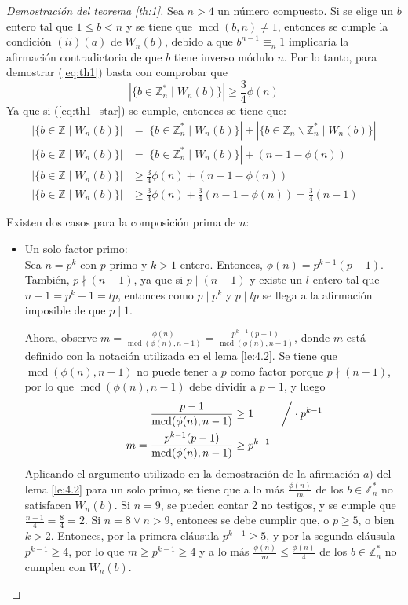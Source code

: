 \documentclass[hidelinks, 12pt]{article}
\newcommand{\Z}{\mathbb{Z}}
\newcommand{\Zs}{\mathbb{Z}^*}
\DeclareMathOperator{\mcd}{mcd}
\begin{document}
\begin{proof}[Demostración del teorema \ref{th:1}]
    Sea $n>4$ un número compuesto. Si se elige un $b$ entero tal que $1\leq b<n$ y se tiene que $\mcd(b,n)\neq 1$, entonces se cumple la condición $(ii)(a)$ de $W_n(b)$, debido a que $b^{n-1}\equiv_n 1$ implicaría la afirmación contradictoria de que $b$ tiene inverso módulo $n$. Por lo tanto, para demostrar (\ref{eq:th1}) basta con comprobar que
    \begin{equation}
        |\{b\in\Zs_n\mid W_n(b)\}|\geq\frac{3}{4}\phi(n)
        \label{eq:th1_star}
    \end{equation}
    Ya que si (\ref{eq:th1_star}) se cumple, entonces se tiene que:
    \begin{align*}
        |\{b\in\Z\mid W_n(b)\}|&=|\{b\in\Zs_n\mid W_n(b)\}|+|\{b\in\Z_n\backslash\Zs_n\mid W_n(b)\}| \\
        |\{b\in\Z\mid W_n(b)\}|&=|\{b\in\Zs_n\mid W_n(b)\}|+(n-1-\phi(n)) \\
        |\{b\in\Z\mid W_n(b)\}|&\geq\frac{3}{4}\phi(n)+(n-1-\phi(n)) \\
        |\{b\in\Z\mid W_n(b)\}|&\geq\frac{3}{4}\phi(n)+\frac{3}{4}(n-1-\phi(n))=\frac{3}{4}(n-1)
    \end{align*}

    Existen dos casos para la composición prima de $n$:
    \begin{itemize}
        \item Un solo factor primo: \\
            Sea $n=p^k$ con $p$ primo y $k>1$ entero. Entonces, $\phi(n)=p^{k-1}(p-1)$. También, $p\nmid(n-1)$, ya que si $p\mid(n-1)$ y existe un $l$ entero tal que $n-1=p^k-1=lp$, entonces como $p\mid p^k$ y $p\mid lp$ se llega a la afirmación imposible de que $p\mid 1$. 
            
            Ahora, observe $m=\frac{\phi(n)}{\mcd(\phi(n),n-1)}=\frac{p^{k-1}(p-1)}{\mcd(\phi(n),n-1)}$, donde $m$ está definido con la notación utilizada en el lema \ref{le:4.2}. Se tiene que $\mcd(\phi(n),n-1)$ no puede tener a $p$ como factor porque $p\nmid(n-1)$, por lo que $\mcd(\phi(n),n-1)$ debe dividir a $p-1$, y luego 
            \begin{align*}
                \quad&&\frac{p-1}{\mcd(\phi(n),n-1)}&\geq 1&&\bigg{/}\cdot p^{k-1} \\
                \quad&&m=\frac{p^{k-1}(p-1)}{\mcd(\phi(n),n-1)}&\geq p^{k-1}
            \end{align*}
            Aplicando el argumento utilizado en la demostración de la afirmación $a)$ del lema \ref{le:4.2} para un solo primo, se tiene que a lo más $\frac{\phi(n)}{m}$ de los $b\in\Zs_n$ no satisfacen $W_n(b)$. Si $n=9$, se pueden contar 2 no testigos, y se cumple que $\frac{n-1}{4}=\frac{8}{4}=2$. Si $n=8\vee n>9$, entonces se debe cumplir que, o $p\geq 5$, o bien $k>2$. Entonces, por la primera cláusula $p^{k-1}\geq 5$, y por la segunda cláusula $p^{k-1}\geq 4$, por lo que $m\geq p^{k-1}\geq 4$ y a lo más $\frac{\phi(n)}{m}\leq\frac{\phi(n)}{4}$ de los $b\in\Zs_n$ no cumplen con $W_n(b)$.            


\end{itemize}
\end{proof}
\end{document}
